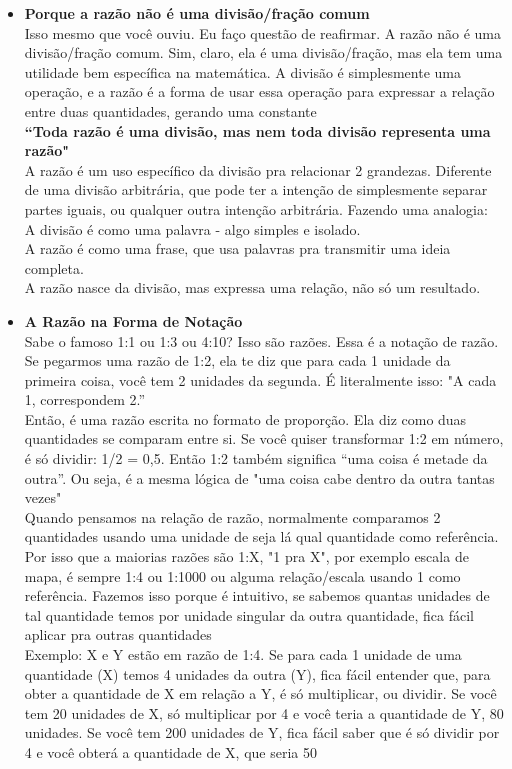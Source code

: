 \documentclass{article}
\begin{document}
\begin{itemize}
    \item \textbf{Porque a razão não é uma divisão/fração comum}\\[5pt] Isso mesmo que você ouviu. Eu faço questão de reafirmar. A razão não é uma divisão/fração comum. Sim, claro, ela é uma divisão/fração, mas ela tem uma utilidade bem específica na matemática. A divisão é simplesmente uma operação, e a razão é a forma de usar essa operação para expressar a relação entre duas quantidades, gerando uma constante
    \\[5pt]
    \textbf{``Toda razão é uma divisão, mas nem toda divisão representa uma razão"}
    \\[5pt]
    A razão é um uso específico da divisão pra relacionar 2 grandezas. Diferente de uma divisão arbitrária, que pode ter a intenção de simplesmente separar partes iguais, ou qualquer outra intenção arbitrária. Fazendo uma analogia:
    \\[5pt]
    A divisão é como uma palavra - algo simples e isolado.
    \\
    A razão é como uma frase, que usa palavras pra transmitir uma ideia completa.
    \\
    A razão nasce da divisão, mas expressa uma relação, não só um resultado.

    \item \textbf{A Razão na Forma de Notação}\\[5pt] Sabe o famoso 1:1 ou 1:3 ou 4:10? Isso são razões. Essa é a notação de razão. Se pegarmos uma razão de 1:2, ela te diz que para cada 1 unidade da primeira coisa, você tem 2 unidades da segunda. É literalmente isso: "A cada 1, correspondem 2.”
    \\[5pt]
    Então, é uma razão escrita no formato de proporção. Ela diz como duas quantidades se comparam entre si. Se você quiser transformar 1:2 em número, é só dividir: 1/2 = 0,5. Então 1:2 também significa “uma coisa é metade da outra”. Ou seja, é a mesma lógica de "uma coisa cabe dentro da outra tantas vezes"
    \\[5pt]
    Quando pensamos na relação de razão, normalmente comparamos 2 quantidades usando uma unidade de seja lá qual quantidade como referência. Por isso que a maiorias razões são 1:X, "1 pra X", por exemplo escala de mapa, é sempre 1:4 ou 1:1000 ou alguma relação/escala usando 1 como referência. Fazemos isso porque é intuitivo, se sabemos quantas unidades de tal quantidade temos por unidade singular da outra quantidade, fica fácil aplicar pra outras quantidades
    \\[5pt]
    Exemplo: X e Y estão em razão de 1:4. Se para cada 1 unidade de uma quantidade (X) temos 4 unidades da outra (Y), fica fácil entender que, para obter a quantidade de X em relação a Y, é só multiplicar, ou dividir. Se você tem 20 unidades de X, só multiplicar por 4 e você teria a quantidade de Y, 80 unidades. Se você tem 200 unidades de Y, fica fácil saber que é só dividir por 4 e você obterá a quantidade de X, que seria 50
    
\end{itemize}
    
\end{document}
